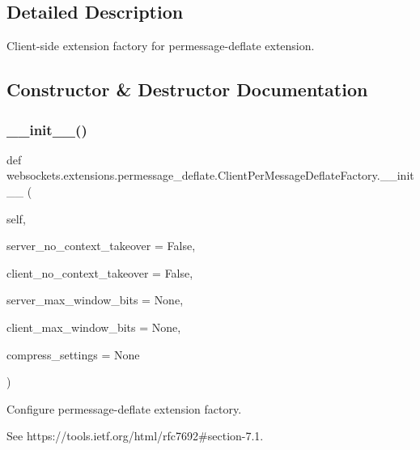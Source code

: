 \subsection{Detailed Description}
\begin{DoxyVerb}Client-side extension factory for permessage-deflate extension.\end{DoxyVerb}
 

\subsection{Constructor \& Destructor Documentation}
\mbox{\label{classwebsockets_1_1extensions_1_1permessage__deflate_1_1_client_per_message_deflate_factory_acccda4b2223492f61411ad77ef269a5a}} 
\subsubsection{\texorpdfstring{\+\_\+\+\_\+init\+\_\+\+\_\+()}{\_\_init\_\_()}}
{\footnotesize\ttfamily def websockets.\+extensions.\+permessage\+\_\+deflate.\+Client\+Per\+Message\+Deflate\+Factory.\+\_\+\+\_\+init\+\_\+\+\_\+ (\begin{DoxyParamCaption}\item[{}]{self,  }\item[{}]{server\+\_\+no\+\_\+context\+\_\+takeover = {\ttfamily False},  }\item[{}]{client\+\_\+no\+\_\+context\+\_\+takeover = {\ttfamily False},  }\item[{}]{server\+\_\+max\+\_\+window\+\_\+bits = {\ttfamily None},  }\item[{}]{client\+\_\+max\+\_\+window\+\_\+bits = {\ttfamily None},  }\item[{}]{compress\+\_\+settings = {\ttfamily None} }\end{DoxyParamCaption})}

\begin{DoxyVerb}Configure permessage-deflate extension factory.

See https://tools.ietf.org/html/rfc7692#section-7.1.\end{DoxyVerb}
 

